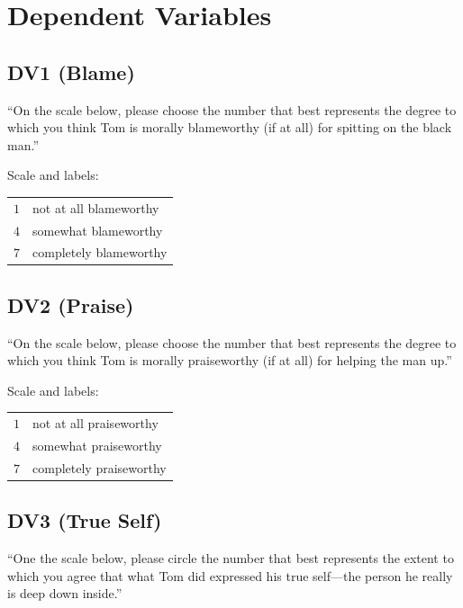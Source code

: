 \documentclass[scrarticle]{scrartcl}
\begin{document}
\section{Dependent Variables}


\subsection*{DV1 (Blame)}
\enquote{On the scale below, please choose the number that best represents the degree to which you think Tom is morally blameworthy (if at all) for spitting on the black man.}

\vspace{0.75em}
\noindent Scale and labels:

\vspace{0.75em}
\begin{tabular}{r @{ = } l}
    $1$   & not at all blameworthy   \\
    $4$   & somewhat blameworthy     \\
    $7$   & completely blameworthy   \\
\end{tabular}


\subsection*{DV2 (Praise)}
\enquote{On the scale below, please choose the number that best represents the degree to which you think Tom is morally praiseworthy (if at all) for helping the man up.}

\vspace{0.75em}
\noindent Scale and labels:

\vspace{0.75em}
\begin{tabular}{r @{ = } l}
    $1$   & not at all praiseworthy   \\
    $4$   & somewhat praiseworthy     \\
    $7$   & completely praiseworthy   \\
\end{tabular}


\subsection*{DV3 (True Self)}
\enquote{One the scale below, please circle the number that best represents the extent to which you agree that what Tom did expressed his true self---the person he really is deep down inside.}
\end{document}
